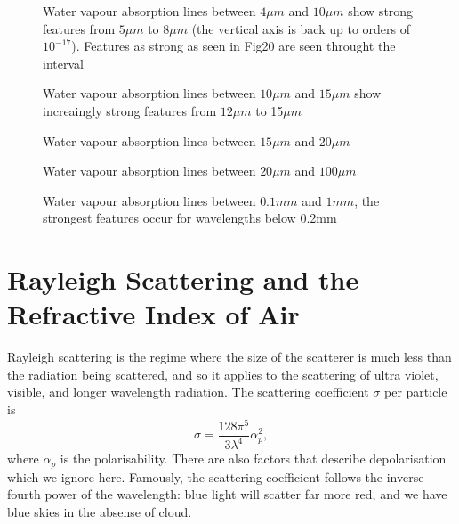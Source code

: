\documentclass[12pt]{article}
\begin{document}
\vspace*{11.5cm}
\begin{figure}[htb]
\caption{Water vapour absorption lines between $4\mu m$ and $10\mu m$
   show  strong features from $5\mu m$ to 8$\mu m$ (the vertical axis
 is back up to orders of $10^{-17}$). Features as strong as seen in Fig20 are seen 
throught the interval}    
\end{figure}
\newpage
\vspace*{11.5cm}
\begin{figure}[htb]
\caption{Water vapour absorption lines between $10\mu m$ and $15\mu m$
   show  increaingly strong features from $12\mu m$ to 15$\mu m$}
\end{figure}
\newpage


\vspace*{11.5cm}
\begin{figure}[htb]
\caption{Water vapour absorption lines between $15\mu m$ and $20\mu m$}
\end{figure}
\newpage

\vspace*{11.5cm}
\begin{figure}[htb]
\caption{Water vapour absorption lines between $20\mu m$ and $100\mu m$}
\end{figure}
\newpage

\vspace*{11.5cm}
\begin{figure}[htb]
\caption{Water vapour absorption lines between $0.1 mm$ and $1mm$, the
strongest features occur for wavelengths below 0.2mm}
\end{figure}
\newpage




\section{Rayleigh Scattering and the Refractive Index of Air}

Rayleigh scattering is the regime where the size of the scatterer is much less than the radiation
being scattered, and so it applies to the scattering of ultra violet, visible, and longer wavelength
radiation. The scattering coefficient $\sigma$ per particle is
\begin{equation}
\sigma=\frac{128 \pi^5}{3 \lambda^4} \alpha_p^2,
\end{equation}
where $\alpha_p$ is the polarisability. There are also
 factors that describe depolarisation \cite{Chandrasekhar:Mybib}
 which we ignore here. Famously, the scattering coefficient follows the inverse fourth power
of the wavelength: blue light will scatter far more red, and we have blue skies in the absense of
cloud.
\end{document}
